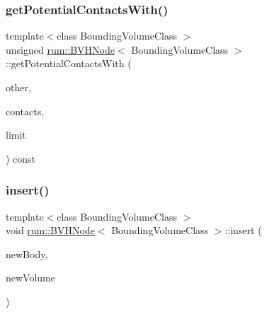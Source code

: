 \subsubsection{\texorpdfstring{get\+Potential\+Contacts\+With()}{getPotentialContactsWith()}}
{\footnotesize\ttfamily template$<$class Bounding\+Volume\+Class $>$ \\
unsigned \mbox{\hyperlink{classrum_1_1_b_v_h_node}{rum\+::\+B\+V\+H\+Node}}$<$ Bounding\+Volume\+Class $>$\+::get\+Potential\+Contacts\+With (\begin{DoxyParamCaption}\item[{\mbox{\hyperlink{classrum_1_1_b_v_h_node}{B\+V\+H\+Node}}$<$ Bounding\+Volume\+Class $>$ $\ast$}]{other,  }\item[{\mbox{\hyperlink{structrum_1_1_potential_contacts}{Potential\+Contacts}} $\ast$}]{contacts,  }\item[{unsigned}]{limit }\end{DoxyParamCaption}) const\hspace{0.3cm}{\ttfamily [protected]}}

\mbox{\label{classrum_1_1_b_v_h_node_a5dfec848630b5b123edcdf4bb4587f0e}} 
\subsubsection{\texorpdfstring{insert()}{insert()}}
{\footnotesize\ttfamily template$<$class Bounding\+Volume\+Class $>$ \\
void \mbox{\hyperlink{classrum_1_1_b_v_h_node}{rum\+::\+B\+V\+H\+Node}}$<$ Bounding\+Volume\+Class $>$\+::insert (\begin{DoxyParamCaption}\item[{\mbox{\hyperlink{classrum_1_1_rigid_body}{Rigid\+Body}} $\ast$}]{new\+Body,  }\item[{const Bounding\+Volume\+Class \&}]{new\+Volume }\end{DoxyParamCaption})\hspace{0.3cm}{\ttfamily [protected]}}

\mbox{\label{classrum_1_1_b_v_h_node_acabad7db26492af7a8e9fec6441466d4}} 
